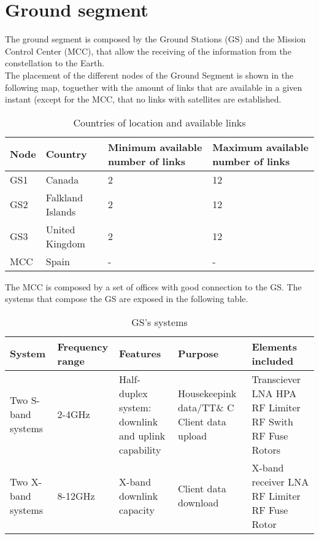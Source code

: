 \section{Ground segment}
The ground segment is composed by the Ground Stations (GS) and the Mission Control Center (MCC), that allow the receiving of the information from the constellation to the Earth.\\
The placement of the different nodes of the Ground Segment is shown in the following map, toguether with the amount of links that are available in a given instant (except for the MCC, that no links with satellites are established.  
\begin{table}[H]
\begin{center}
\begin{tabular}{|l|l|p{3.5cm}|p{3.5cm}|}
\hline
\rowcolor[gray]{0.80} \textbf{Node}&\textbf{Country}&\textbf{Minimum available number of links}&\textbf{Maximum available number of links}\\
\hline
GS1&Canada&2&12\\
\hline
GS2&Falkland Islands&2&12\\
\hline
GS3&United Kingdom&2&12\\
\hline
MCC&Spain&-&-\\
\hline
\end{tabular}
\caption{Countries of location and available links}
\end{center}
\end{table}
The MCC is composed by a set of offices with good connection to the GS. The systems that compose the GS are exposed in the following table. 
\begin{table}[H]
\begin{center}
\begin{tabular}{|p{1.5cm}|p{2cm}|p{3cm}|p{3cm}|p{3cm}|}
\hline
\rowcolor[gray]{0.80} \textbf{System}&\textbf{Frequency range}&\textbf{Features}&\textbf{Purpose}&\textbf{Elements included}\\
\hline
Two S-band systems&2-4GHz&Half-duplex system: downlink and uplink capability&Housekeepink data/TT\& C \newline
Client data upload&
Transciever 
\newline
LNA
\newline
HPA
\newline
RF Limiter
\newline
RF Swith
\newline
RF Fuse
\newline
Rotors\\
\hline
Two X-band systems&8-12GHz&X-band downlink capacity&Client data download&X-band receiver
\newline
LNA
\newline
RF Limiter
\newline
RF Fuse
\newline
Rotor\\
\hline
\end{tabular}
\caption{GS's systems}
\end{center}
\end{table}